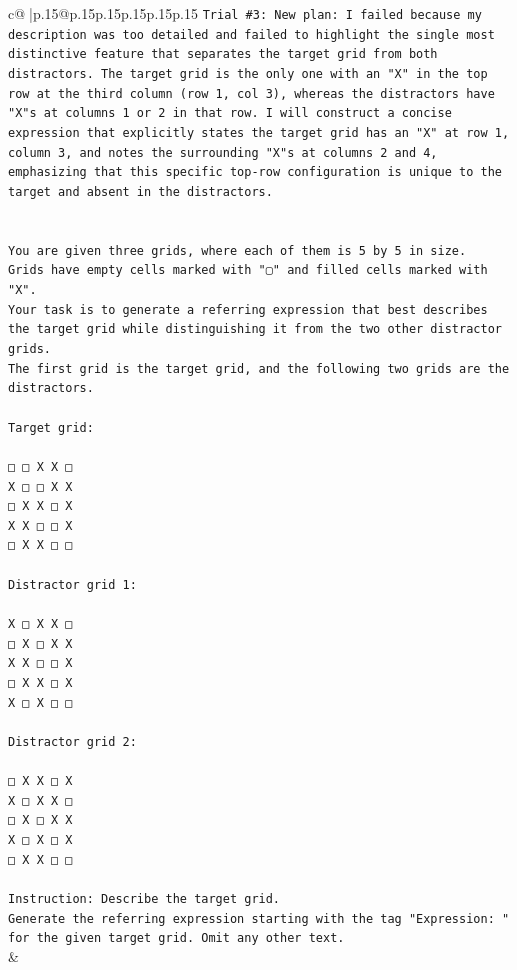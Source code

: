 \documentclass{article}
\begin{document}
{\begin{supertabular}{c@{$\;$}|p{.15\linewidth}@{}p{.15\linewidth}p{.15\linewidth}p{.15\linewidth}p{.15\linewidth}p{.15\linewidth}}
{{{\texttt{Trial \#3: New plan: I failed because my description was too detailed and failed to highlight the single most distinctive feature that separates the target grid from both distractors. The target grid is the only one with an "X" in the top row at the third column (row 1, col 3), whereas the distractors have "X"s at columns 1 or 2 in that row. I will construct a concise expression that explicitly states the target grid has an "X" at row 1, column 3, and notes the surrounding "X"s at columns 2 and 4, emphasizing that this specific top{-}row configuration is unique to the target and absent in the distractors.} \\
\\ 
\\ 
\texttt{You are given three grids, where each of them is 5 by 5 in size.} \\
\texttt{Grids have empty cells marked with "▢" and filled cells marked with "X".} \\
\texttt{Your task is to generate a referring expression that best describes the target grid while distinguishing it from the two other distractor grids.} \\
\texttt{The first grid is the target grid, and the following two grids are the distractors.} \\
\\ 
\texttt{Target grid:} \\
\\ 
\texttt{□ □ X X □} \\
\texttt{X □ □ X X} \\
\texttt{□ X X □ X} \\
\texttt{X X □ □ X} \\
\texttt{□ X X □ □} \\
\\ 
\texttt{Distractor grid 1:} \\
\\ 
\texttt{X □ X X □} \\
\texttt{□ X □ X X} \\
\texttt{X X □ □ X} \\
\texttt{□ X X □ X} \\
\texttt{X □ X □ □} \\
\\ 
\texttt{Distractor grid 2:} \\
\\ 
\texttt{□ X X □ X} \\
\texttt{X □ X X □} \\
\texttt{□ X □ X X} \\
\texttt{X □ X □ X} \\
\texttt{□ X X □ □} \\
\\ 
\texttt{Instruction: Describe the target grid.} \\
\texttt{Generate the referring expression starting with the tag "Expression: " for the given target grid. Omit any other text.} \\
            }
        }
    }
    & \\ \\


\end{supertabular}}
\end{document}
